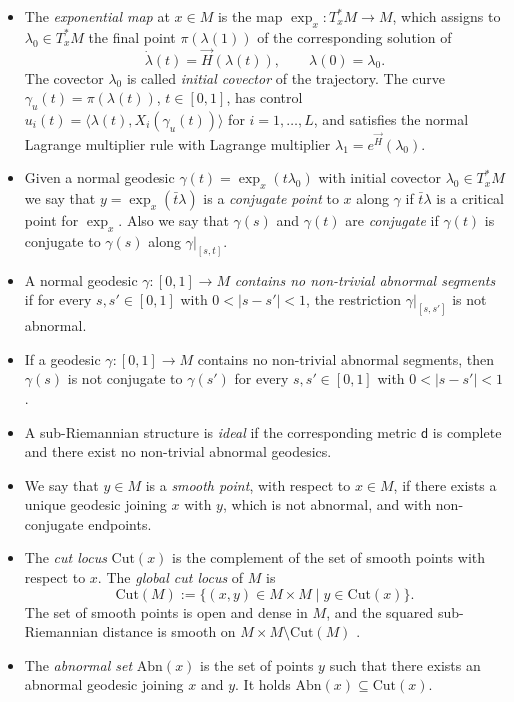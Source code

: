 \documentclass[11pt,a4paper]{article}
\theoremstyle{plain}
\theoremstyle{definition}
\theoremstyle{remark}
\numberwithin{equation}{section}
\newcommand{\Cut}{\mathrm{Cut}}
\newcommand{\sfd}{\mathsf d}
\begin{document}
\begin{itemize}
\item The \emph{exponential map} at $x \in M$ is the map $\exp_x : T_x^*M \to M$, which assigns to $\lambda_{0}\in T_x^*M$ the final point $\pi(\lambda(1))$  of the corresponding solution of 
\[
\dot{\lambda}(t) = \vec{H}(\lambda(t)),\qquad \lambda(0)=\lambda_{0}.
\]
The covector $\lambda_{0}$ is called \emph{initial covector} of the trajectory. The curve $\gamma_u(t) = \pi(\lambda(t))$, $t\in[0,1]$, has control $u_i(t)=\langle \lambda(t),X_i(\gamma_u(t))\rangle$ for $i=1,\dots,L$, and satisfies the normal Lagrange multiplier rule with Lagrange multiplier $\lambda_{1}=e^{\vec H}(\lambda_{0})$.

\item Given a normal geodesic $\gamma(t) = \exp_x(t\lambda_{0})$ with initial covector $\lambda_0 \in T_x^*M$
we say that $y=\exp_x(\bar{t}\lambda)$ is a \emph{conjugate point} to $x$ along $\gamma$ if $\bar{t}\lambda$ is a critical point for $\exp_x$. Also we say that $\gamma(s)$ and $\gamma(t)$ are \emph{conjugate} if $\gamma(t)$ is conjugate to $\gamma(s)$ along $\gamma|_{[s,t]}$.

\item A normal geodesic $\gamma:[0,1]\to M$ \emph{contains no non-trivial abnormal segments} if for every $s,s'\in [0,1]$ with $0<|s-s'|<1$, the restriction $\gamma|_{[s,s']}$ is not abnormal.
\item If a geodesic $\gamma: [0,1] \to M$ contains no non-trivial abnormal segments, then $\gamma(s)$ is not conjugate to $\gamma(s')$ for every $s,s'\in [0,1]$ with $0<|s-s'|<1$.

\item A sub-Riemannian structure is \emph{ideal} if the  corresponding metric  $\sfd$ is complete and there exist no non-trivial abnormal geodesics.

\item We say that $y\in M$ is a \emph{smooth point}, with respect to $x\in M$, if there exists a unique geodesic joining $x$ with $y$, which is not abnormal, and with non-conjugate endpoints.
\item The \emph{cut locus} $\Cut(x)$ is the complement of the set of smooth points with respect to $x$. The \emph{global cut locus} of $M$ is 
\begin{equation}
\Cut(M) := \{(x,y) \in M \times M \mid y \in \Cut(x)\}.
\end{equation}
The set of smooth points is open and dense in $M$, and the squared sub-Riemannian distance is smooth on $M\times M \setminus \Cut(M)$ \cite{agrasmoothness,RT-MorseSard}.

\item The \emph{abnormal set} $\mathrm{Abn}(x)$ is the set of points $y$ such that there exists an abnormal geodesic joining $x$ and $y$. It holds $\mathrm{Abn}(x)\subseteq \mathrm{Cut}(x)$. 
\end{itemize}
\end{document}
